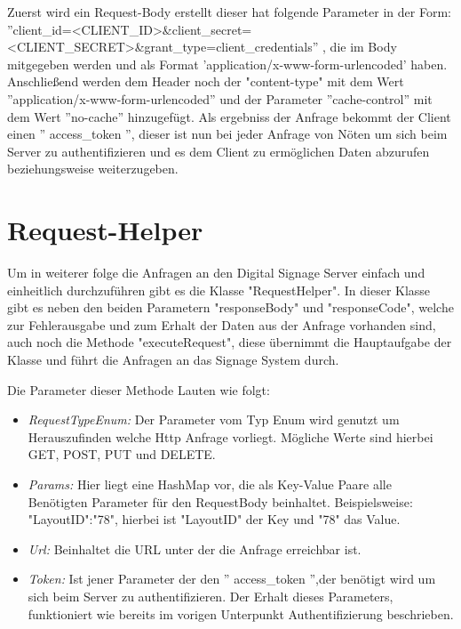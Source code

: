 Zuerst wird ein Request-Body erstellt dieser hat folgende Parameter in der Form: 
 ''client\_id=<CLIENT\_ID>\&client\_secret=<CLIENT\_SECRET>\&grant\_type=client\_credentials''
, die im Body mitgegeben werden und als Format 'application/x-www-form-urlencoded'  haben. Anschließend werden dem Header noch der "content-type" mit dem Wert ''application/x-www-form-urlencoded'' und der Parameter ''cache-control'' mit dem Wert ''no-cache'' hinzugefügt. Als ergebniss der Anfrage bekommt der Client einen '' access\_token '', dieser ist nun bei jeder Anfrage von Nöten um sich beim Server zu authentifizieren und es dem Client zu ermöglichen Daten abzurufen beziehungsweise weiterzugeben.

\section{Request-Helper}
Um in weiterer folge die Anfragen an den Digital Signage Server einfach und einheitlich durchzuführen gibt es die Klasse "RequestHelper". In dieser Klasse gibt es neben den beiden Parametern "responseBody" und "responseCode", welche zur Fehlerausgabe und zum Erhalt der Daten aus der Anfrage vorhanden sind, auch noch die Methode "executeRequest", diese übernimmt die Hauptaufgabe der Klasse und führt die Anfragen an das Signage System durch.

Die Parameter dieser Methode Lauten wie folgt:

\begin{itemize}
	\item {\em RequestTypeEnum:} Der Parameter vom Typ Enum wird genutzt um Herauszufinden welche Http Anfrage vorliegt. Mögliche Werte sind hierbei GET, POST, PUT und DELETE.
	
	\item {\em Params:} Hier liegt eine HashMap vor, die als Key-Value Paare alle Benötigten Parameter für den RequestBody beinhaltet. Beispielsweise: "LayoutID":"78", hierbei ist "LayoutID" der Key und "78" das Value.
		
	\item {\em Url:} Beinhaltet die URL unter der die Anfrage erreichbar ist. 
	
	\item {\em Token:} Ist jener Parameter der den '' access\_token '',der benötigt wird um sich beim Server zu authentifizieren. Der Erhalt dieses Parameters, funktioniert wie bereits im vorigen Unterpunkt Authentifizierung beschrieben.
	
\end{itemize}

